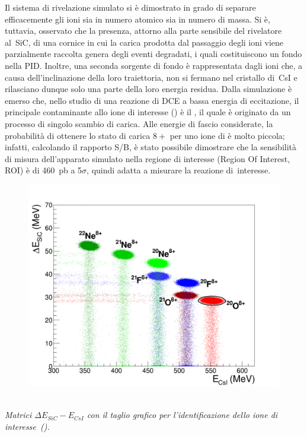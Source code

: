 \documentclass[10pt,foldmark,notumble]{leaflet}
\begin{document}
Il sistema di rivelazione simulato si è dimostrato in grado di separare efficacemente gli ioni sia in numero atomico sia in numero di massa.
Si è, tuttavia, osservato che la presenza, attorno alla parte sensibile del rivelatore al~SiC, di una cornice in cui la carica prodotta dal passaggio degli ioni viene parzialmente raccolta genera degli eventi degradati, i quali costituiscono un fondo nella PID.
Inoltre, una seconda sorgente di fondo è rappresentata dagli ioni che, a causa dell'inclinazione della loro traiettoria, non si fermano nel cristallo di~CsI e rilasciano dunque solo una parte della loro energia residua.
Dalla simulazione è emerso che, nello studio di una reazione di DCE a bassa energia di eccitazione, il principale contaminante allo ione di interesse () è il , il quale è originato da un processo di singolo scambio di carica.
Alle energie di fascio considerate, la probabilità di ottenere lo stato di carica $8+$ per uno ione di  è molto piccola; infatti, calcolando il rapporto S/B, è stato possibile dimostrare che la sensibilità di misura dell'apparato simulato nella regione di interesse (Region Of Interest, ROI) è di 460~pb a 5$\sigma$, quindi adatta a misurare la reazione di~interesse.
\begin{figure} [!h]
	\centering
	\includegraphics[width=0.8\columnwidth, keepaspectratio]{Grafici_Tesi2/PIDnew/deltaE_Ecsi_quadrata_taglio_menoeventi2.png}
\end{figure}\\
\textit{ Matrici $\Delta E_{SiC} - E_{CsI}$ con il taglio grafico per l'identificazione dello ione di interesse~().}\\
\end{document}
